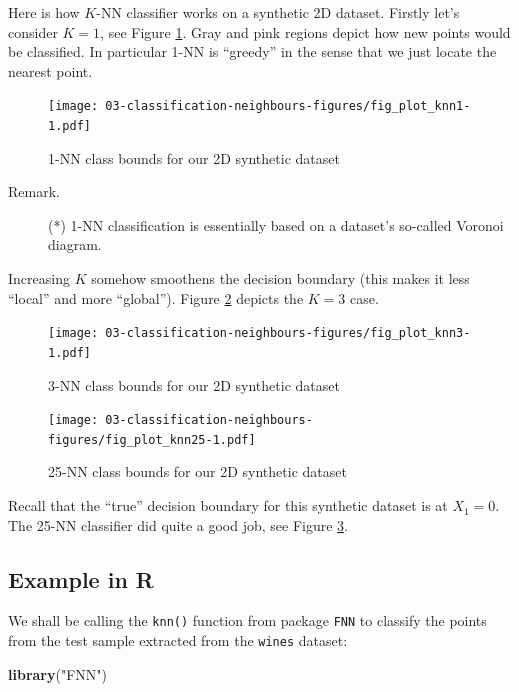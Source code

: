 \documentclass[10pt,b5paper,krantz1]{krantz}
\newenvironment{Shaded}{\begin{snugshade}}{\end{snugshade}}
\newcommand{\KeywordTok}[1]{\textcolor[rgb]{0.27,0.27,0.27}{\textbf{#1}}}
\newcommand{\NormalTok}[1]{#1}
\newcommand{\StringTok}[1]{\textcolor[rgb]{0.5,0.5,0.5}{#1}}
\begin{document}
Here is how \(K\)-NN classifier works on a synthetic 2D dataset.
Firstly let's consider \(K=1\), see Figure \ref{fig:fig_plot_knn1}.
Gray and pink regions depict how new points would be classified.
In particular 1-NN is ``greedy'' in the sense that we just
locate the nearest point.

\begin{figure}
\hypertarget{fig:fig_plot_knn1}{%
\centering
\texttt{[image: 03-classification-neighbours-figures/fig\_plot\_knn1-1.pdf]}
\caption{1-NN class bounds for our 2D synthetic dataset}\label{fig:fig_plot_knn1}
}
\end{figure}

\begin{description}
\item[Remark.]
(*) 1-NN classification is essentially based
on a dataset's so-called Voronoi diagram.
\end{description}

Increasing \(K\) somehow smoothens the decision boundary (this makes it
less ``local'' and more ``global'').
Figure \ref{fig:fig_plot_knn3} depicts the \(K=3\) case.

\begin{figure}
\hypertarget{fig:fig_plot_knn3}{%
\centering
\texttt{[image: 03-classification-neighbours-figures/fig\_plot\_knn3-1.pdf]}
\caption{3-NN class bounds for our 2D synthetic dataset}\label{fig:fig_plot_knn3}
}
\end{figure}

\begin{figure}
\hypertarget{fig:fig_plot_knn25}{%
\centering
\texttt{[image: 03-classification-neighbours-figures/fig\_plot\_knn25-1.pdf]}
\caption{25-NN class bounds for our 2D synthetic dataset}\label{fig:fig_plot_knn25}
}
\end{figure}

Recall that the ``true'' decision boundary for this synthetic dataset
is at \(X_1=0\). The 25-NN classifier did quite a good job, see Figure \ref{fig:fig_plot_knn25}.

\hypertarget{example-in-r}{%
\subsection{Example in R}\label{example-in-r}}

We shall be calling the \texttt{knn()} function from package \texttt{FNN}
to classify the points from the test sample
extracted from the \texttt{wines} dataset:

\begin{Shaded}
\begin{Highlighting}[]
\KeywordTok{library}\NormalTok{(}\StringTok{"FNN"}\NormalTok{)}
\end{Highlighting}
\end{Shaded}
\end{document}
